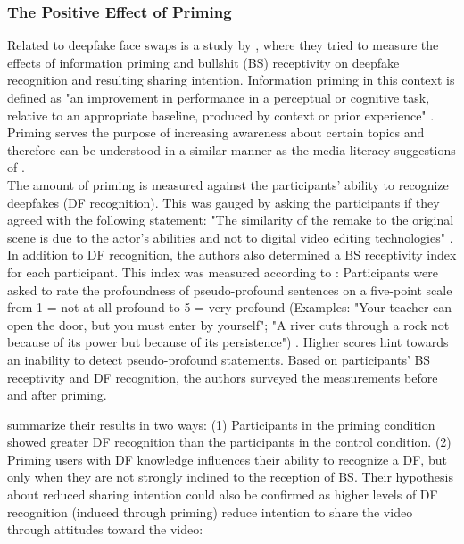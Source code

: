 \documentclass[
  a4paper,  %
  twoside,  %
  bibliography=totoc,
  headsepline,
  cleardoublepage=empty,
  parskip=half,
  draft=false
]{scrbook}
\begin{document}
\subsubsection*{The Positive Effect of Priming}
Related to deepfake face swaps is a study by \citeauthor{iacobucciDeepfakesUnmaskedEffects2021}, where they tried to measure the effects of information priming and bullshit (BS) receptivity on deepfake recognition and resulting sharing intention. Information priming in this context is defined as "an improvement in performance in a perceptual or cognitive task, relative to an appropriate baseline, produced by context or prior experience" \cite[p. 195]{iacobucciDeepfakesUnmaskedEffects2021}. Priming serves the purpose of increasing awareness about certain topics and therefore can be understood in a similar manner as the media literacy suggestions of \citeauthor{hwangEffectsDisinformationUsing2021}. \\
The amount of priming is measured against the participants' ability to recognize deepfakes (DF recognition). This was gauged by asking the participants if they agreed with the following statement: "The similarity of the remake to the original scene is due to the actor's abilities and not to digital video editing technologies" \cite[p. 197]{iacobucciDeepfakesUnmaskedEffects2021}. In addition to DF recognition, the authors also determined a BS receptivity index for each participant. This index was measured according to \cite{pennycookReceptionDetectionPseudoprofound2015}: Participants were asked to rate the profoundness of pseudo-profound sentences on a five-point scale from 1 = not at all profound to 5 = very profound (Examples: "Your teacher can open the door, but you must enter by yourself"; "A river cuts through a rock not because of its power but because of its persistence") \cite[p. 197]{iacobucciDeepfakesUnmaskedEffects2021}. Higher scores hint towards an inability to detect pseudo-profound statements. Based on participants' BS receptivity and DF recognition, the authors surveyed the measurements before and after priming.

\citeauthor{iacobucciDeepfakesUnmaskedEffects2021} summarize their results in two ways: (1) Participants in the priming condition showed greater DF recognition than the participants in the control condition. (2) Priming users with DF knowledge influences their ability to recognize a DF, but only when they are not strongly inclined to the reception of BS. Their hypothesis about reduced sharing intention could also be confirmed as higher levels of DF recognition (induced through priming) reduce intention to share the video through attitudes toward the video:
\end{document}
